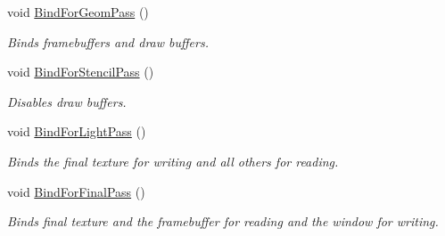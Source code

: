 \begin{DoxyCompactItemize}
\mbox{\label{class_geometry_engine_1_1_geometry_buffer_1_1_g_buffer_ae64ee0860824a077b2fab97440a0bb9e}} 
void \mbox{\hyperlink{class_geometry_engine_1_1_geometry_buffer_1_1_g_buffer_ae64ee0860824a077b2fab97440a0bb9e}{Bind\+For\+Geom\+Pass}} ()
\begin{DoxyCompactList}\small\item\em Binds framebuffers and draw buffers. \end{DoxyCompactList}\item 
\mbox{\label{class_geometry_engine_1_1_geometry_buffer_1_1_g_buffer_ad95cdd645bd506eac9b2dfb1dee3fa7e}} 
void \mbox{\hyperlink{class_geometry_engine_1_1_geometry_buffer_1_1_g_buffer_ad95cdd645bd506eac9b2dfb1dee3fa7e}{Bind\+For\+Stencil\+Pass}} ()
\begin{DoxyCompactList}\small\item\em Disables draw buffers. \end{DoxyCompactList}\item 
\mbox{\label{class_geometry_engine_1_1_geometry_buffer_1_1_g_buffer_ac5949998af55b92bdb753e055c49f26d}} 
void \mbox{\hyperlink{class_geometry_engine_1_1_geometry_buffer_1_1_g_buffer_ac5949998af55b92bdb753e055c49f26d}{Bind\+For\+Light\+Pass}} ()
\begin{DoxyCompactList}\small\item\em Binds the final texture for writing and all others for reading. \end{DoxyCompactList}\item 
\mbox{\label{class_geometry_engine_1_1_geometry_buffer_1_1_g_buffer_ae35be249f45427e6425dfdaf2c67e61c}} 
void \mbox{\hyperlink{class_geometry_engine_1_1_geometry_buffer_1_1_g_buffer_ae35be249f45427e6425dfdaf2c67e61c}{Bind\+For\+Final\+Pass}} ()
\begin{DoxyCompactList}\small\item\em Binds final texture and the framebuffer for reading and the window for writing. \end{DoxyCompactList}\item 
\mbox{\label{class_geometry_engine_1_1_geometry_buffer_1_1_g_buffer_ac11c8a78abc4221466afd2d73f40b97b}} 

\end{DoxyCompactItemize}
